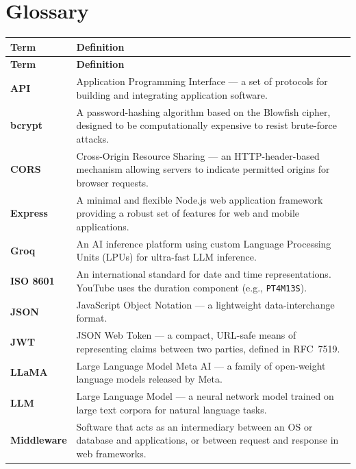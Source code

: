\documentclass[12pt,a4paper]{report}
\begin{document}
\chapter{Glossary}

\begin{longtable}{l p{10cm}}
\toprule
\textbf{Term} & \textbf{Definition} \\
\midrule
\endfirsthead
\toprule
\textbf{Term} & \textbf{Definition} \\
\midrule
\endhead
\bottomrule
\endfoot

\textbf{API}          & Application Programming Interface --- a set of protocols for building and integrating application software. \\
\textbf{bcrypt}       & A password-hashing algorithm based on the Blowfish cipher, designed to be computationally expensive to resist brute-force attacks. \\
\textbf{CORS}         & Cross-Origin Resource Sharing --- an HTTP-header-based mechanism allowing servers to indicate permitted origins for browser requests. \\
\textbf{Express}      & A minimal and flexible Node.js web application framework providing a robust set of features for web and mobile applications. \\
\textbf{Groq}         & An AI inference platform using custom Language Processing Units (LPUs) for ultra-fast LLM inference. \\
\textbf{ISO 8601}     & An international standard for date and time representations. YouTube uses the duration component (e.g., \texttt{PT4M13S}). \\
\textbf{JSON}         & JavaScript Object Notation --- a lightweight data-interchange format. \\
\textbf{JWT}          & JSON Web Token --- a compact, URL-safe means of representing claims between two parties, defined in RFC~7519. \\
\textbf{LLaMA}        & Large Language Model Meta AI --- a family of open-weight language models released by Meta. \\
\textbf{LLM}          & Large Language Model --- a neural network model trained on large text corpora for natural language tasks. \\
\textbf{Middleware}    & Software that acts as an intermediary between an OS or database and applications, or between request and response in web frameworks. \\

\end{longtable}
\end{document}
